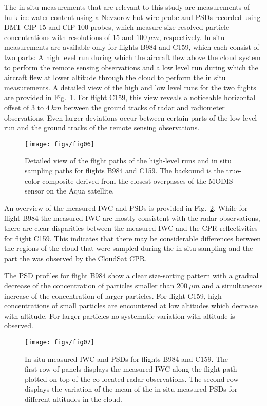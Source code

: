 \documentclass[journal abbreviation, manuscript]{copernicus}
\begin{document}
The in situ measurements that are relevant to this study are measurements of
bulk ice water content using a Nevzorov hot-wire probe \citep{korolev13} and
PSDs recorded using DMT CIP-15 and CIP-100 probes, which measure size-resolved
particle concentrations with resolutions of 15 and $100\ \unit{\mu m}$,
respectively. In situ measurements are available only for flights B984 and C159,
which each consist of two parts: A high level run during which the aircraft flew
above the cloud system to perform the remote sensing observations and a low level
run during which the aircraft flew at lower altitude through the
cloud to perform the in situ measurements. A detailed view of the high and low
level runs for the two flights are provided in
Fig.~\ref{fig:flight_overview_detail}. For flight C159, this view reveals a
noticeable horizontal offset of $3$ to $4\ \unit{km}$ between the ground tracks
of radar and radiometer observations. Even larger deviations occur between
certain parts of the low level run and the ground tracks of the remote sensing
observations.

\begin{figure}[h!]
  \centering
  \texttt{[image: figs/fig06]}
  \caption{
    Detailed view of the flight paths of the high-level runs and in situ sampling
    paths for flights B984 and C159. The backound is the true-color composite
    derived from the closest overpasses of the MODIS \citep{modis} sensor
    on the Aqua satellite.
    }
  \label{fig:flight_overview_detail}
\end{figure}

An overview of the  measured IWC and PSDs is provided in Fig.~\ref{fig:in_situ}.
While for flight B984 the measured IWC are mostly consistent with the radar
observations, there are clear disparities between the measured IWC and the CPR
reflectivities for flight C159. This indicates that there may be considerable
differences between the regions of the cloud that were sampled during the
in situ sampling and the part the was observed by the CloudSat CPR.

The PSD profiles for flight B984 show a clear size-sorting pattern with a
gradual decrease of the concentration of particles smaller than $200\ \unit{\mu
  m}$ and a simultaneous increase of the concentration of larger particles. For
flight C159, high concentrations of small particles are encountered at low
altitudes which decrease with altitude. For larger particles no systematic
variation with altitude is observed.

\begin{figure}[hbpt!]
  \centering
  \texttt{[image: figs/fig07]}
  \caption{ In situ measured IWC and PSDs for flights B984 and C159. The first
    row of panels displays the measured IWC along the flight path plotted on top
    of the co-located radar observations. The second row displays the variation
    of the mean of the in situ measured PSDs for different altitudes in the
    cloud.
    }
  \label{fig:in_situ}
\end{figure}
\end{document}
